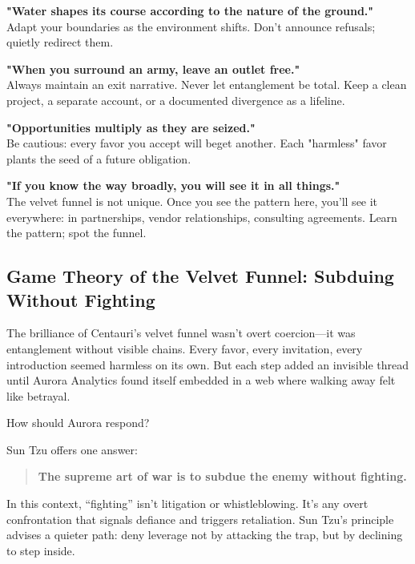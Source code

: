 {  \item \textbf{"Water shapes its course according to the nature of the ground."} \\
  Adapt your boundaries as the environment shifts. Don't announce refusals; quietly redirect them.

  \item \textbf{"When you surround an army, leave an outlet free."} \\
  Always maintain an exit narrative. Never let entanglement be total. Keep a clean project, a separate account, or a documented divergence as a lifeline.

  \item \textbf{"Opportunities multiply as they are seized."} \\
  Be cautious: every favor you accept will beget another. Each "harmless" favor plants the seed of a future obligation.

  \item \textbf{"If you know the way broadly, you will see it in all things."} \\
  The velvet funnel is not unique. Once you see the pattern here, you'll see it everywhere: in partnerships, vendor relationships, consulting agreements. Learn the pattern; spot the funnel.
}



\subsection{Game Theory of the Velvet Funnel: Subduing Without Fighting}

The brilliance of Centauri’s velvet funnel wasn’t overt coercion—it was entanglement without visible chains. Every favor, every invitation, every introduction seemed harmless on its own. But each step added an invisible thread until Aurora Analytics found itself embedded in a web where walking away felt like betrayal.

How should Aurora respond?

Sun Tzu offers one answer:

\begin{quote}
\textbf{The supreme art of war is to subdue the enemy without fighting.}
\end{quote}

In this context, “fighting” isn’t litigation or whistleblowing. It’s any overt confrontation that signals defiance and triggers retaliation. Sun Tzu’s principle advises a quieter path: deny leverage not by attacking the trap, but by declining to step inside.

